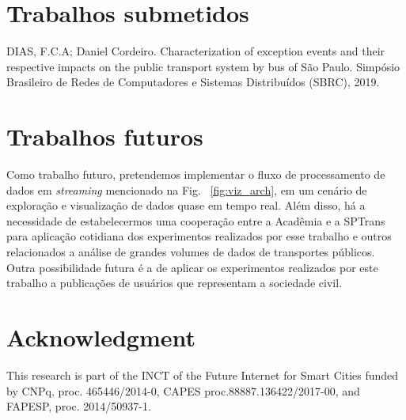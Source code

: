 \documentclass[
	12pt,				%
	oneside,			%
	a4paper,			%
	english,			%
	brazil				%
	]{abntex2ppgsi}
\begin{document}
{{\section{Trabalhos submetidos}

DIAS, F.C.A; Daniel Cordeiro. Characterization of exception events and their respective impacts on the public transport system by bus of São Paulo. Simpósio Brasileiro de Redes de Computadores e Sistemas Distribuídos (SBRC), 2019.

\section{Trabalhos futuros}
Como trabalho futuro, pretendemos implementar o fluxo de processamento de dados em \textit{streaming} mencionado na Fig. ~\ref{fig:viz_arch}, em um cenário de exploração e visualização de dados quase em tempo real.  Além disso, há a necessidade de estabelecermos uma cooperação entre a Acadêmia e a SPTrans para aplicação cotidiana dos experimentos realizados por esse trabalho e outros relacionados a análise de grandes volumes de dados de transportes públicos. Outra possibilidade futura é a de aplicar os experimentos realizados por este trabalho a publicações de usuários que representam a sociedade civil.

\section*{Acknowledgment}
This research is part of the INCT of the Future Internet for Smart Cities funded by CNPq, proc. 465446/2014-0, CAPES proc.88887.136422/2017-00, and FAPESP, proc. 2014/50937-1.

\postextual

\listoftodos[Notes]


%
%


}}
\end{document}
